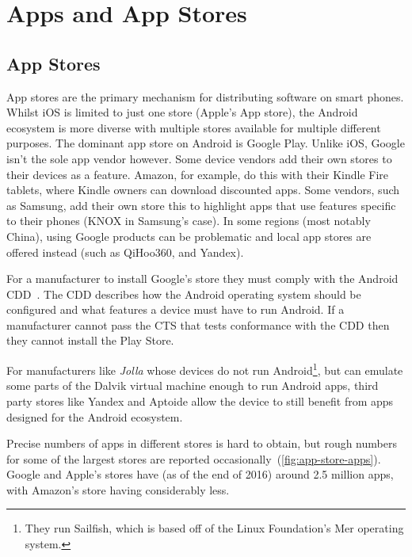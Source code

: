 \documentclass[thesis.tex]{subfiles}
\begin{document}
\chapter{Apps and App Stores}
\label{chap:apps-and-stores}

\section{App Stores}

App stores are the primary mechanism for distributing software on smart phones.
Whilst iOS is limited to just one store (Apple's App store), the Android ecosystem is more diverse with multiple stores available for multiple different purposes.
The dominant app store on Android is Google Play. 
Unlike iOS, Google isn't the sole app vendor however.
Some device vendors add their own stores to their devices as a feature.
Amazon, for example, do this with their Kindle Fire tablets, where Kindle owners can download discounted apps.
Some vendors, such as Samsung, add their own store this to highlight apps that use features specific to their phones (KNOX in Samsung's case).
In some regions (most notably China), using Google products can be problematic and local app stores are offered instead (such as QiHoo360, and Yandex).

For a manufacturer to install Google's store they must
comply with the Android \ac{CDD}~\cite{???}.  The \ac{CDD} describes how the
Android operating system should be configured and what features a device must
have to run Android.  If a manufacturer cannot pass the \ac{CTS} that tests
conformance with the \ac{CDD} then they cannot install the Play Store.

For manufacturers like \emph{Jolla} whose devices do not run
Android\footnote{They run Sailfish, which is based off of the Linux Foundation's
Mer operating system.}, but can emulate some parts of the Dalvik virtual machine
enough to run Android apps, third party stores like Yandex and Aptoide allow the
device to still benefit from apps designed for the Android ecosystem.

Precise numbers of apps in different stores is hard to obtain, but rough numbers for some of the largest stores are reported occasionally~(\autoref{fig:app-store-apps}).
Google and Apple's stores have (as of the end of 2016) around 2.5 million apps, with Amazon's store having considerably less.
\end{document}
